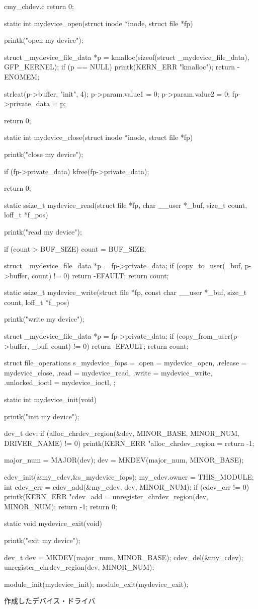 \begin{longlisting}
\begin{myminted}{c}{my_chdev.c}
{    return 0;
}

static int mydevice_open(struct inode *inode, struct file *fp) {
    printk("open my device\n");

    struct _mydevice_file_data *p = kmalloc(sizeof(struct _mydevice_file_data), GFP_KERNEL);
    if (p == NULL) {
        printk(KERN_ERR  "kmalloc\n");
        return -ENOMEM;
    }

    strlcat(p->buffer, "init", 4);
    p->param.value1 = 0;
    p->param.value2 = 0;
    fp->private_data = p;

    return 0;
}

static int mydevice_close(struct inode *inode, struct file *fp) {
    printk("close my device\n");

    if (fp->private_data) {
        kfree(fp->private_data);
    }

    return 0;
}

static ssize_t mydevice_read(struct file *fp, char __user *_buf, size_t count, loff_t *f_pos) {
    printk("read my device\n");

    if (count > BUF_SIZE) count = BUF_SIZE;

    struct _mydevice_file_data *p = fp->private_data;
    if (copy_to_user(_buf, p->buffer, count) != 0) {
        return -EFAULT;
    }
    return count;
}

static ssize_t mydevice_write(struct file *fp, const char __user *_buf, size_t count, loff_t *f_pos) {
    printk("write my device\n");

    struct _mydevice_file_data *p = fp->private_data;
    if (copy_from_user(p->buffer, _buf, count) != 0) {
        return -EFAULT;
    }
    return count;
}

struct file_operations s_mydevice_fops = {
    .open    = mydevice_open,
    .release = mydevice_close,
    .read    = mydevice_read,
    .write   = mydevice_write,
    .unlocked_ioctl = mydevice_ioctl,
};

static int mydevice_init(void) {
    printk("init my device\n");

    dev_t dev;
    if (alloc_chrdev_region(&dev, MINOR_BASE, MINOR_NUM, DRIVER_NAME) != 0) {
        printk(KERN_ERR  "alloc_chrdev_region = %
        return -1;
    }

    major_num = MAJOR(dev);
    dev = MKDEV(major_num, MINOR_BASE);

    cdev_init(&my_cdev,&s_mydevice_fops);
    my_cdev.owner = THIS_MODULE;
    int cdev_err = cdev_add(&my_cdev, dev, MINOR_NUM);
    if (cdev_err != 0) {
        printk(KERN_ERR  "cdev_add = %
        unregister_chrdev_region(dev, MINOR_NUM);
        return -1;
    }
    return 0;
}

static void mydevice_exit(void) {
    printk("exit my device\n");

    dev_t dev = MKDEV(major_num, MINOR_BASE);
    cdev_del(&my_cdev);
    unregister_chrdev_region(dev, MINOR_NUM);
}

module_init(mydevice_init);
module_exit(mydevice_exit);
\end{myminted}
\caption{作成したデバイス・ドライバ}
\label{lst:chdev}
\end{longlisting}


